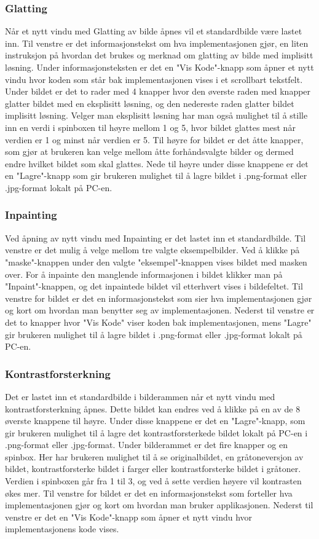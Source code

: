 \subsubsection{Glatting}
Når et nytt vindu med Glatting av bilde åpnes vil et standardbilde være lastet inn. Til venstre er det informasjonstekst om hva implementasjonen gjør, en liten instruksjon på hvordan det brukes og merknad om glatting av bilde med implisitt løsning. Under informasjonsteksten er det en "Vis Kode"-knapp som åpner et nytt vindu hvor koden som står bak implementasjonen vises i et scrollbart tekstfelt. Under bildet er det to rader med 4 knapper hvor den øverste raden med knapper glatter bildet med en eksplisitt løsning, og den nedereste raden glatter bildet implisitt løsning. Velger man eksplisitt løsning har man også mulighet til å stille inn en verdi i spinboxen til høyre mellom 1 og 5, hvor bildet glattes mest når verdien er 1 og minst når verdien er 5. Til høyre for bildet er det åtte knapper, som gjør at brukeren kan velge mellom åtte forhåndsvalgte bilder og dermed endre hvilket bildet som skal glattes. Nede til høyre under disse knappene er det en "Lagre"-knapp som gir brukeren mulighet til å lagre bildet i .png-format eller .jpg-format lokalt på PC-en. 

\subsubsection{Inpainting}
Ved åpning av nytt vindu med Inpainting er det lastet inn et standardbilde. Til venstre er det mulig å velge mellom tre valgte eksempelbilder. Ved å klikke på "maske"-knappen under den valgte "eksempel"-knappen vises bildet med masken over. For å inpainte den manglende informasjonen i bildet klikker man på "Inpaint"-knappen, og det inpaintede bildet vil etterhvert vises i bildefeltet. Til venstre for bildet er det en informasjonstekst som sier hva implementasjonen gjør og kort om hvordan man benytter seg av implementasjonen. Nederst til venstre er det to knapper hvor "Vis Kode" viser koden bak implementasjonen, mens "Lagre" gir brukeren mulighet til å lagre bildet i .png-format eller .jpg-format lokalt på PC-en.

\subsubsection{Kontrastforsterkning}
Det er lastet inn et standardbilde i bilderammen når et nytt vindu med kontrastforsterkning åpnes. Dette bildet kan endres ved å klikke på en av de 8 øverste knappene til høyre. Under disse knappene er det en "Lagre"-knapp, som gir brukeren mulighet til å lagre det kontrastforsterkede bildet lokalt på PC-en i .png-format eller .jpg-format. Under bilderammet er det fire knapper og en spinbox. Her har brukeren mulighet til å se originalbildet, en gråtoneversjon av bildet, kontrastforsterke bildet i farger eller kontrastforsterke bildet i gråtoner. Verdien i spinboxen går fra 1 til 3, og ved å sette verdien høyere vil kontrasten økes mer. Til venstre for bildet er det en informasjonstekst som forteller hva implementasjonen gjør og kort om hvordan man bruker applikasjonen. Nederst til venstre er det en "Vis Kode"-knapp som åpner et nytt vindu hvor implementasjonens kode vises.

